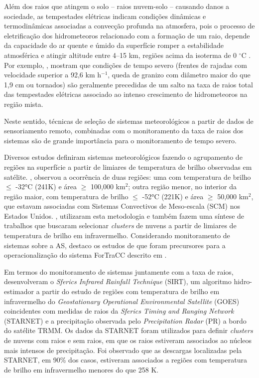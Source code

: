 Além dos raios que atingem o solo -- raios nuvem-solo -- causando danos a sociedade, as tempestades elétricas indicam condições dinâmicas e termodinâmicas associadas a convecção profunda na atmosfera, pois o processo de eletrificação dos hidrometeoros relacionado com a formação de um raio, depende da capacidade do ar quente e úmido da superfície romper a estabilidade atmosférica e atingir altitude entre 4--15 km, regiões acima da isoterma de 0 $^{\circ}$C \cite{doswell2001,zipser2006}. Por exemplo,   , mostram que condições de tempo severo (frentes de rajadas com velocidade superior a 92,6 km h$^{-1}$, queda de granizo com diâmetro maior do que 1,9 cm ou tornados) são geralmente precedidas de um salto na taxa de raios total das tempestades elétricas associado ao intenso crescimento de hidrometeoros na região mista.      

Neste sentido, técnicas de seleção de sistemas meteorológicos a partir de dados de sensoriamento remoto, combinadas com o monitoramento da taxa de raios dos sistemas são de grande importância para o monitoramento de tempo severo. 

Diversos estudos definiram sistemas meteorológicos fazendo o agrupamento de regiões na superfície a partir de limiares de temperatura de brilho observadas em satélite. , observou a ocorrência de duas regiões: uma com temperatura de brilho $\leqslant$ -32°C (241K) e área $\geqslant$ 100,000 km$^2$;  outra região menor, no interior da região maior, com temperatura de brilho $\leqslant$ -52°C (221K) e área $\geqslant$ 50,000 km$^2$, que estavam associadas com Sistemas Convectivos de Meso-escala (SCM) nos Estados Unidos.  , utilizaram esta metodologia e também fazem uma síntese de trabalhos que buscaram selecionar \textit{clusters} de nuvens a partir de limiares de temperatura de brilho em infravermelho. Considerando monitoramento de sistemas sobre a AS, destaco os estudos de  que foram precursores para a operacionalização do sistema ForTraCC descrito em \cite{vila2008}.


Em termos do monitoramento de sistemas juntamente com a taxa de raios,  desenvolveram o \textit{Sferics
Infrared Rainfall Technique} (SIRT), 
um algoritmo hidro-estimador a partir do estudo de regiões com temperatura de brilho em infravermelho do \textit{Geostationary Operational Environmental Satellite} (GOES) coincidentes com medidas de raios da \textit{Sferics Timing and Ranging Network} (STARNET) e a precipitação observada pelo \textit{Precipitation Radar} (PR)  a bordo do satélite TRMM. Os dados da STARNET foram utilizados para definir \textit{clusters} de nuvens com raios e sem raios, em que os raios estiveram associados ao núcleos mais intensos de precipitação. Foi observado que as descargas localizadas pela STARNET, em 90\% dos casos, estiveram associados a regiões com temperatura de brilho em infravermelho menores do que 258 K.

